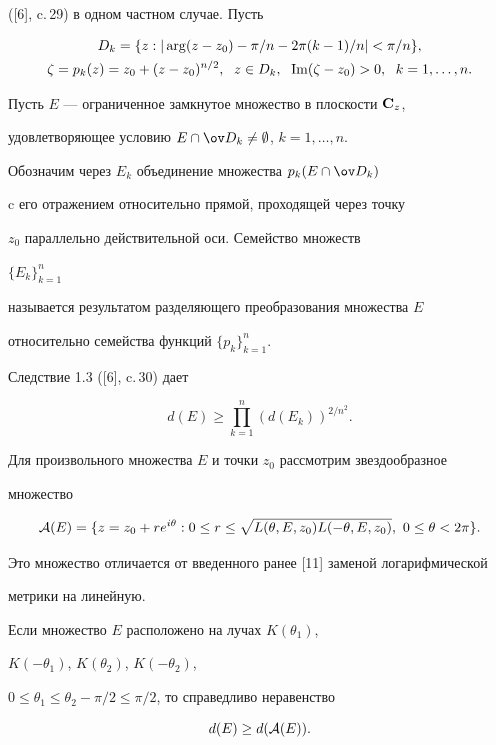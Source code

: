 ([6], c.\,29) в одном частном случае. Пусть 


\begin{gather*}


D_k=\{ z: |\arg(z-z_0)-\pi/n-2\pi(k-1)/n|<\pi/n\},\\


\zeta=p_k(z)=z_0+(z-z_0)^{n/2},\ \; z\in D_k,\ \; \im(\zeta-z_0)>0,


\ \; k=1,\dotsc,n.


\end{gather*}


Пусть $E$ --- ограниченное замкнутое множество в плоскости $\bold C_z$, 


удовлетворяющее условию $E\cap\ov D_k\ne\emptyset$, $k=1,\dotsc,n$.


Обозначим через $E_k$ объединение множества $p_k(E\cap\ov D_k)$


c его отражением относительно прямой, проходящей через точку


$z_0$ параллельно действительной оси. Семейство множеств 


$\{ E_k\}^{n}_{k=1}$


называется результатом разделяющего преобразования множества $E$


относительно семейства функций $\{ p_k\} ^{n}_{k=1}$.


Следствие 1.3 ([6], c.\,30) дает


\begin{equation}


d(E)\geq \prod_{k=1}^n(d(E_k))^{2/n^2}.


\end{equation}





Для произвольного множества $E$ и точки $z_0$ рассмотрим звездообразное


множество 


$$


{\cal A}(E)= \{ z=z_0+re^{i\theta}: 0\leq r\leq\sqrt{L(\theta, E,z_0)


L(-\theta, E,z_0)},\ 0\leq\theta<2\pi\}.


$$


Это множество отличается от введенного ранее [11] заменой логарифмической


метрики на линейную.  





\begin{thm} Если множество $E$ расположено на лучах $K(\theta_1)$,


$K(-\theta_1)$, $K(\theta_2)$, $K(-\theta_2)$, 


$0\leq\theta_1\leq\theta_2-\pi/2\leq\pi/2$, то справедливо неравенство


$$


d(E)\geq d({\cal A}(E)).


$$


\end{thm}






